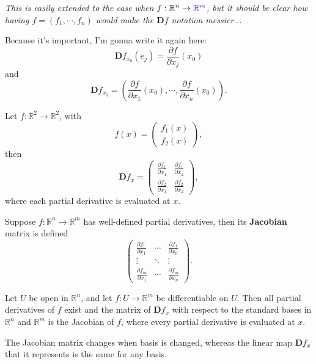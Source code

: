 \documentclass[twoside,10pt]{report}
\begin{document}
\textit{This is easily extended to the case when $f: \mathbb{R}^n \to {\color{blue}\mathbb{R}^m}$, but it should be clear how having $f=(f_1, \cdots, f_n)$ would make the $\mathbf{D}f$ notation messier...}

\begin{note}[]
Because it's important, I'm gonna write it again here:
\[
	\mathbf{D}f_{x_0}(e_j) = \frac{\partial f}{\partial x_j} (x_0)
\] 
and
\[
\mathbf{D}f_{x_0} = \left( \frac{\partial f}{\partial x_1} (x_0), \cdots, \frac{\partial f}{\partial x_n} (x_0) \right).
\] 
\end{note}

\newpage
\begin{ex}[]
Let $f: \mathbb{R}^2 \to \mathbb{R}^2$, with
\[
	f(x) = 
	\begin{pmatrix}
		f_1(x) \\
		f_2(x)
	\end{pmatrix},
\] then
\[
\mathbf{D}f_{x} =
\begin{pmatrix}
	\frac{\partial f_1}{\partial x_1} & \frac{\partial f_1}{\partial x_2} \\
	\frac{\partial f_2}{\partial x_1} & \frac{\partial f_2}{\partial x_2}
\end{pmatrix},
\] where each partial derivative is evaluated at $x$.
\end{ex}

\begin{defn}[]
Suppose $f:\mathbb{R}^n \to \mathbb{R}^m$ has well-defined partial derivatives, then its \textbf{Jacobian} matrix is defined
\[
\begin{pmatrix}
	\frac{\partial f_1}{\partial x_1} & \cdots & \frac{\partial f_1}{\partial x_n} \\
	\vdots & \ddots & \vdots \\
	\frac{\partial f_m}{\partial x_1} & \cdots & \frac{\partial f_m}{\partial x_n} 
\end{pmatrix}.
\] 
\end{defn}

\begin{thrm}[]
Let $U$ be open in $\mathbb{R}^n$, and let $f:U \to \mathbb{R}^m$ be differentiable on $U$. Then all partial derivatives of $f$ exist and the matrix of $\mathbf{D}f_{x}$ with respect to the standard bases in $\mathbb{R}^n$ and $\mathbb{R}^m$ is the Jacobian of $f$, where every partial derivative is evaluated at $x$.
\end{thrm}

\begin{note}[]
The Jacobian matrix changes when basis is changed, whereas the linear map $\mathbf{D}f_x$ that it represents is the same for any basis.
\end{note}
\end{document}
